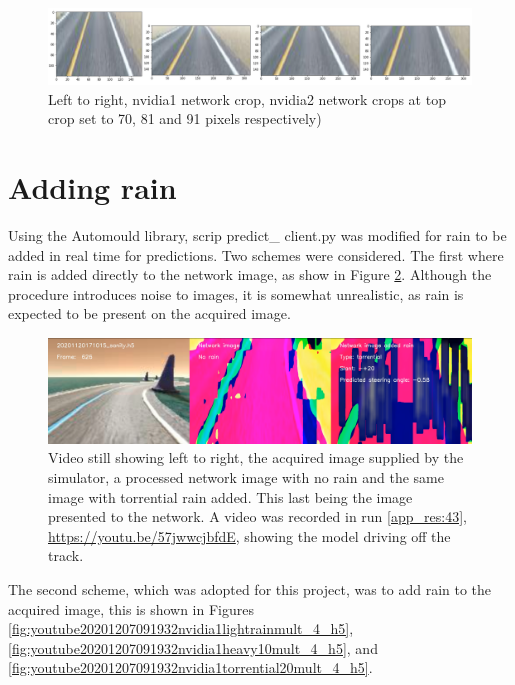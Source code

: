 \begin{figure}[ht]
 \centering 
 \includegraphics[width=\textwidth]{Figures/nvidia1x1_nvidia2x3_crops.png}
 \caption{Left to right, nvidia1 network crop, nvidia2 network crops at top crop set to 70, 81 and 91 pixels respectively)}
 \label{fig:nvidia1x1_nvidia2x3_crops_results} %
\end{figure}



\section{Adding rain}
\label{res:adding-rain-section}
Using the Automould library, scrip predict\_ client.py was modified for rain to be added in real time for predictions. Two schemes were considered. The first where rain is added directly to the network image, as show in Figure \ref{fig:tcpflow_Run43}. Although the procedure introduces noise to images, it is somewhat unrealistic, as rain is expected to be present on the acquired image.
\begin{figure}[ht]
 \centering 
 \includegraphics[width=\textwidth]{Figures/tcpflow_Run43.png}
 \caption{Video still showing left to right, the acquired image supplied by the simulator, a processed network image with no rain and the same image with torrential rain added. This last being the image presented to the network. A video was recorded in run \ref{app_res:43}, \url{https://youtu.be/57jwwcjbfdE}, showing the model driving off the track.}
 \label{fig:tcpflow_Run43} 
\end{figure}
The second scheme, which was adopted for this project, was to add rain to the acquired image, this is shown in Figures  \ref{fig:youtube20201207091932nvidia1lightrainmult_4_h5},
\ref{fig:youtube20201207091932nvidia1heavy10mult_4_h5}, and
 \ref{fig:youtube20201207091932nvidia1torrential20mult_4_h5}.

